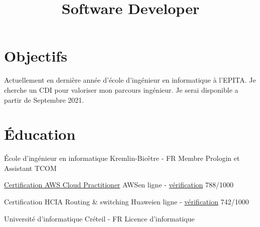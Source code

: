 \documentclass[10pt,a4paper,sans]{moderncv}
\title{Software Developer}
\newcommand\en[1]{}
\newcommand\fr[1]{#1}
\newcommand\full[1]{}
\begin{document}
\makecvtitle
\vspace*{-10mm}

\section{\fr{Objectifs}\en{Objectives}}
\fr{
    Actuellement en dernière année d'école d'ingénieur en informatique à
    l'EPITA.
    Je cherche un CDI pour valoriser mon parcours ingénieur.
    Je serai disponible a partir de Septembre 2021.
    \full{
        Je cherche à appliquer mes compétences analytiques aux défis proposés
        par un stage dans votre entreprise.
        Mes capacités en Algorithmique et en recherche permettront à votre
        organisation d'atteindre ses objectifs.
    }
}
\en{
    Seeking to apply my analytical skills to the challenges posed by a
    job at your company.
    Poses proven algorithmic and research abilities that will aid your company
    in meeting its milestones.
}

\section{\fr{\'Education}\en{Education}}
{\fr{\'Ecole d'ingénieur en informatique}\en{Computer Engineering}}
{Kremlin-Bicêtre - FR}
{\fr{Membre Prologin et Assistant TCOM}\en{Member of the Prologin Association and TCOM assistant}}{}

\cventry{\fr{Jan}\en{Jun} 2021}
{\href{https://aws.amazon.com/fr/certification/certified-cloud-practitioner/}{Certification AWS Cloud Practitioner}}
{AWS}{\fr{en ligne}\en{online} - \href{https://www.youracclaim.com/badges/4ab6148a-29a4-4b70-82c2-60c8b5c0c473}{v\fr{\'}erification}}
{788/1000}
{}

\cventry{D\fr{\'}ec 2020}
{Certification HCIA Routing \& switching}
{Huawei}{\fr{en ligne}\en{online} - \href{https://e.huawei.com/en/talent/\#/cert/certificate-verification}{v\fr{\'}erification}}
{742/1000}
{}

\full{\cventry{2020}{Huawei}
{\fr{Formation des les équipements et sur eNSP}\en{Training about equipments and eNSP}}
{Visio conference}
{}{}}

{\fr{Université d'informatique}\en{Computer Engineering focused School}}
{Créteil - FR}
{\fr{Licence d'informatique}}{}

\full{\cventry{2018}{Google}{Q{\&}A Meeting with an Google Software Engineer.}
{FR}{}{}}
\end{document}
